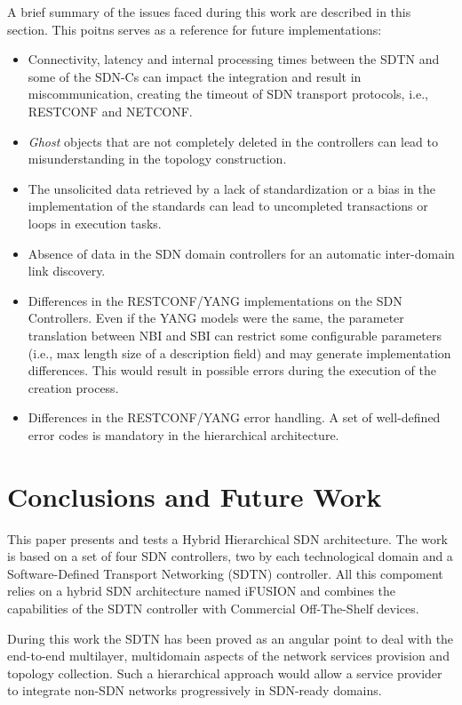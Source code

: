 \documentclass[a4paper,fleqn]{cas-dc}
\begin{document}
A brief summary of the issues faced during this work are described in this section. This poitns serves as a reference for future implementations: 

\begin{itemize}
    \item Connectivity, latency and internal processing times between the SDTN and some of the SDN-Cs can impact the integration and result in miscommunication, creating the timeout of SDN transport protocols, i.e., RESTCONF and NETCONF.  
    \item \textit{Ghost} objects that are not completely deleted in the controllers can lead to misunderstanding in the topology construction. 
    \item The unsolicited data retrieved by a lack of standardization or a bias in the implementation of the standards can lead to uncompleted transactions or loops in execution tasks.
    \item Absence of data in the SDN domain controllers for an automatic inter-domain link discovery.
    \item Differences in the RESTCONF/YANG implementations on the SDN Controllers. Even if the YANG models were the same, the parameter translation between NBI and SBI can restrict some configurable parameters (i.e., max length size of a description field) and may generate implementation differences. This would result in possible errors during the execution of the creation process.
    \item Differences in the RESTCONF/YANG error handling. A set of well-defined error codes is mandatory in the hierarchical architecture.
\end{itemize}

\section{Conclusions and Future Work}
\label{section:conclusions}

This paper presents and tests a Hybrid Hierarchical SDN architecture. The work is based on a set of four SDN controllers, two by each technological domain and a Software-Defined Transport Networking (SDTN) controller. All this compoment relies on a hybrid SDN architecture named iFUSION and combines the capabilities of the SDTN controller with Commercial Off-The-Shelf devices.

During this work the SDTN has been proved as an angular point to deal with the end-to-end multilayer, multidomain aspects of the network services provision and topology collection. Such a hierarchical approach would allow a service provider to integrate non-SDN networks progressively in SDN-ready domains.
\end{document}
